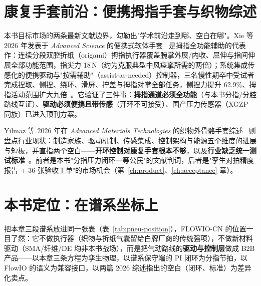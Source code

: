 \section{康复手套前沿：便携拇指手套与织物综述}
\label{sec:pneu-rehab}

本书目标市场的两条最新文献边界，勾勒出"学术前沿走到哪、空白在哪"。Xie 等 2026 年发表于 \emph{Advanced Science} 的便携式软体手套~\cite{Xie2026} 是拇指全功能辅助的代表作：连续分段双腔折纸（origami）拇指执行器覆盖腕掌外展/内收、屈伸与指间伸展全部功能范围，指尖力 18\,N（约为克服典型中风痉挛所需的两倍）；系统集成传感化的便携驱动与"按需辅助"（assist-as-needed）控制器，三名慢性期卒中受试者完成捏取、侧捏、绕环、滑屏、拧盖与拇指对掌全部任务，侧捏力提升 62.9\%、拇指活动范围扩大九倍~\cite{Xie2026}。它验证了三件事：\textbf{拇指通道必须全功能}（与本书分指/分腔路线互证）、\textbf{驱动必须便携且带传感}（开环不可接受）、国产压力传感器（XGZP 同族）已进入顶刊方案。

Yilmaz 等 2026 年在 \emph{Advanced Materials Technologies} 的织物外骨骼手套综述~\cite{Yilmaz2026} 则盘点行业现状：制造家族、驱动机制、传感集成、控制架构与能源五个维度的进展与短板，并直指两个空白——\textbf{开环控制对康复手套根本不够}，以及\textbf{行业缺乏统一测试标准}~\cite{Yilmaz2026}。前者是本书"分指压力闭环一等公民"的文献判词，后者是"孪生对拍精度报告 + 36 张验收工单"的市场机会（第~\ref{ch:product}、\ref{ch:acceptance} 章）。

\section{本书定位：在谱系坐标上}
\label{sec:pneu-position}

把本章三段谱系放进同一张表（表~\ref{tab:pneu-position}），FLOWIO-CN 的位置一目了然：它不做执行器（织物与折纸气囊留给白牌厂商的传统强项），不做新材料驱动（SMA/纤维/DE 均非本书战场），而是把气动路线的\textbf{驱动与控制层}做成 B2B 产品——以本章三条方程为孪生物理，以谱系保守端的 PI 闭环为分指节拍，以 FlowIO 的语义为兼容接口，以两篇 2026 综述指出的空白（闭环、标准）为差异化卖点。

